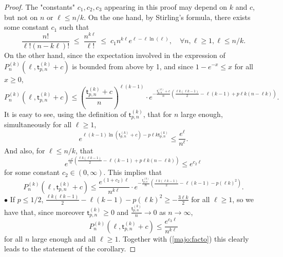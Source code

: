 \documentclass[a4, 11pt]{article}
\numberwithin{equation}{section}
\theoremstyle{plain}
\theoremstyle{definition}
\theoremstyle{remark}
\begin{document}
\begin{proof}
The "constants" $c_1,c_2,c_3$ appearing in this proof may depend on $k$ and $c$, but not on $n$ or $\ell \leq n/k$.
On the one hand, by Stirling's formula, there exists some constant $c_1$ such that  
\begin{equation}
\label{majo:facto}
\frac{n!}{\ell ! (n-k\ell)!} \; \leq \; \frac{n^{k\ell}}{\ell !} \; \leq \; c_1n^{k\ell} e^{\ell-\ell \ln(\ell)}, \quad \forall n,\ell \geq 1, \ell \leq n/k.
\end{equation}
On the other hand, since the expectation involved in the expression of $P_n^{(k)}(\ell,\mathsf t^{(k)}_{p,n}+c)$ is bounded from above by 1, and since $1-e^{-x}\leq x$ for all $x\geq 0$, 
$$
P_n^{(k)}(\ell,\mathsf t^{(k)}_{p,n}+c) \leq \left( \frac{\mathsf t^{(k)}_{p,n}+c}{n}\right)^{\ell (k-1)} \cdot e^{-\frac{\mathsf t^{(k)}_{p,n}+c}{n} \left( \frac{\ell k(\ell k-1)}{2}-\ell(k-1)+p\ell k(n-\ell k)\right)}.
$$
It is easy to see, using the definition of $\mathsf t^{(k)}_{p,n}$, that for $n$ large enough, simultaneously for all $\ell \geq 1$,
$$
e^{\ell(k-1) \ln(\mathsf t^{(k)}_{p,n}+c)-p\ell k \mathsf t^{(k)}_{p,n}} \leq \frac{e^{\ell}}{n^\ell}.
$$
And also, for $\ell \leq n/k$, that 
$$
e^{\frac{-c}{n} \left( \frac{\ell k(\ell k-1)}{2}-\ell(k-1)+p\ell k(n-\ell k)\right)} \leq e^{c_2 \ell}
$$
for some constant $c_2 \in (0,\infty)$. 
This implies that
\begin{equation}
\label{majo:P_n}
P_n^{(k)}(\ell,\mathsf t^{(k)}_{p,n}+c) \leq \frac{e^{(1+c_2) \ell}}{n^{k\ell}} \cdot e^{-\frac{\mathsf t^{(k)}_{p,n}}{n} \left( \frac{\ell k(\ell k-1)}{2}-\ell(k-1)-p(\ell k)^2\right)}.
\end{equation}
$\bullet$ If $p\leq 1/2$, $ \frac{\ell k(\ell k-1)}{2}-\ell(k-1)-p(\ell k)^2 \geq -\frac{3\ell k}{2}$ for all $\ell \geq 1$, so we have that, since moreover $\mathsf t^{(k)}_{p,n} \geq 0$ and $\frac{\mathsf t^{(k)}_{p,n}}{n} \rightarrow 0$ as $n \rightarrow \infty$,
$$
P_n^{(k)}(\ell,\mathsf t^{(k)}_{p,n}+c) \leq \frac{e^{c_3 \ell}}{n^{k\ell}} 
$$
for all $n$ large enough and all $\ell \geq 1$. Together with (\ref{majo:facto}) this clearly leads to the statement of the corollary.


\end{proof}
\end{document}
